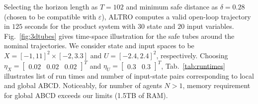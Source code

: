Selecting the horizon length as $T=102$ and minimum safe distance as $\delta=0.28$ (chosen to be compatible with $\varepsilon$), ALTRO computes a valid open-loop trajectory %
in $125$ seconds for the product system with $30$ state and $20$ input variables.  %
 Fig.~\ref{fig:3dtubes} gives time-space illustration for the safe tubes around the nominal trajectories. %
 We consider state and input spaces to be $X=[-1,11]^2\times[-2,3.3]$ and
$U=[-2.4,2.4]^2$, respectively. Choosing  $\eta_{X}=\begin{bmatrix}0.02&0.02&0.02\end{bmatrix}^T$ and $\eta_{U}=\begin{bmatrix}0.3&0.3\end{bmatrix}^T$, Tab.~\ref{tab:runtimes} illustrates list of run times and number of input-state pairs corresponding to local and global ABCD. Noticeably, for number of agents $N>1$, memory requirement for global ABCD exceeds our limits (1.5TB of RAM). 

